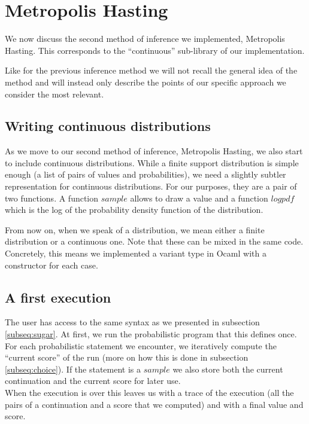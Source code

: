 \documentclass{article}
\begin{document}
\section{Metropolis Hasting}

	We now discuss the second method of inference we implemented, Metropolis Hasting.
	This corresponds to the ``continuous'' sub-library of our implementation.
	
	Like for the previous inference method we will not recall the general idea of the method and will instead only describe the points of our specific approach we consider the most relevant.

	\subsection{Writing continuous distributions}

	As we move to our second method of inference, Metropolis Hasting, we also start to include continuous distributions.
	While a finite support distribution is simple enough (a list of pairs of values and probabilities), we need a slightly subtler representation for continuous distributions.
	For our purposes, they are a pair of two functions. A function $sample$ allows to draw a value and a function $logpdf$ which is the log of the probability density function of the distribution.

	From now on, when we speak of a distribution, we mean either a finite distribution or a continuous one. Note that these can be mixed in the same code.
	Concretely, this means we implemented a variant type in Ocaml with a constructor for each case.

	\subsection{A first execution}

	The user has access to the same syntax as we presented in subsection \ref{subseq:sugar}.
	At first, we run the probabilistic program that this defines once.
	For each probabilistic statement we encounter, we iteratively compute the ``current score'' of the run (more on how this is done in subsection \ref{subseq:choice}).
	If the statement is a $sample$ we also store both the current continuation and the current score for later use. \\

	When the execution is over this leaves us with a trace of the execution (all the pairs of a continuation and a score that we computed) and with a final value and score. 
\end{document}
